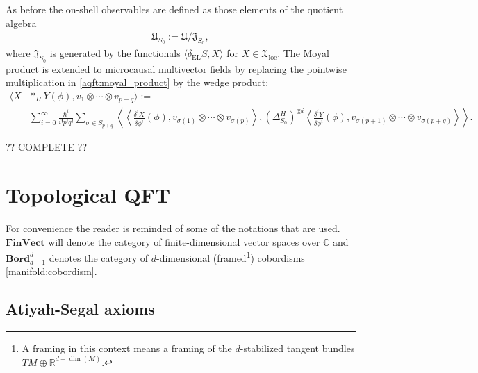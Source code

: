     As before the on-shell observables are defined as those elements of the quotient algebra
    \begin{gather}
        \mathfrak{U}_{S_0} := \mathfrak{U}/\mathfrak{J}_{S_0},
    \end{gather}
    where $\mathfrak{J}_{S_0}$ is generated by the functionals $\langle\delta_\mathrm{EL}S,X\rangle$ for $X\in\mathfrak{X}_\mathrm{loc}$. The Moyal product is extended to microcausal multivector fields by replacing the pointwise multiplication in \eqref{aqft:moyal_product} by the wedge product:
    \begin{align}
        \langle X\!&\ast_H\!Y(\phi),v_1\otimes\cdots\otimes v_{p+q} \rangle := \\
        &\sum_{i=0}^\infty\frac{\hbar^i}{i!p!q!}\sum_{\sigma\in S_{p+q}}\left\langle\!\!\left\langle\frac{\delta^iX}{\delta\phi^i}(\phi),v_{\sigma(1)}\otimes\cdots\otimes v_{\sigma(p)}\right\rangle,(\Delta^H_{S_0})^{\otimes i}\left\langle\frac{\delta^iY}{\delta\phi^i}(\phi),v_{\sigma(p+1)}\otimes\cdots\otimes v_{\sigma(p+q)}\right\rangle\!\!\right\rangle.\nonumber
    \end{align}

    ?? COMPLETE ??

\section{Topological QFT}

    For convenience the reader is reminded of some of the notations that are used. $\mathbf{FinVect}$ will denote the category of finite-dimensional vector spaces over $\mathbb{C}$ and $\mathbf{Bord}^d_{d-1}$ denotes the category of $d$-dimensional (framed\footnote{A framing in this context means a framing of the $d$-stabilized tangent bundles $TM\oplus\mathbb{R}^{d-\dim(M)}$.}) cobordisms \ref{manifold:cobordism}.

\subsection{Atiyah-Segal axioms}

